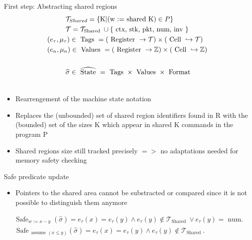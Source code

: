\documentclass[aspectratio=169]{beamer}
\begin{document}
\begin{frame}{First step: Abstracting shared regions}
  $$
    \begin{aligned}
       & \hspace{1cm} \mathcal{T}_{Shared} = \{\text{K} | \text{(w := shared  K)} \in P \}                                                                 \\
       & \hspace{1cm} \mathcal{T}=\mathcal{T}_{\text {Shared }} \cup\{\text { ctx, stk, pkt, num, inv }\}                                                  \\
       & \left(e_\tau, \mu_\tau\right) \in \text { Tags } =(\text { Register } \rightarrow \mathcal{T}) \times(\text { Cell } \hookrightarrow \mathcal{T}) \\
       & \left(e_n, \mu_n\right) \in \text { Values }=(\text { Register } \rightarrow \mathbb{Z}) \times(\text { Cell } \hookrightarrow \mathbb{Z})        \\
       &                                                                                                                                                   \\
       & \vspace{1cm} \hspace{1cm} \widehat{\sigma} \in \widehat{\text { State }}=\text { Tags } \times \text { Values } \times \text { Format }           \\
       &
    \end{aligned}
  $$

  \begin{itemize}
    \item Rearrengement of the machine state notation
    \item Replaces the (unbounded) set of shared region
          identifiers found in R with the (bounded) set of the sizes K
          which appear in shared K commands in the program P
    \item Shared regions size still tracked precisely $=>$ no adaptations needed for memory safety checking
  \end{itemize}
\end{frame}

\begin{frame}{Safe predicate update}
  \begin{itemize}
    \item Pointers to the shared area cannot be substracted or compared
          since it is not possible to distinguish them anymore
  \end{itemize}

  $$
    \begin{aligned}
       & \operatorname{Safe}_{w:=x-y}(\widehat{\sigma})=  e_\tau(x)=e_\tau(y) \wedge e_\tau(y) \notin \mathcal{T}_{\text {Shared }}  \vee e_\tau(y)=\text { num. } \\
       & \text { Safe }_{\text {assume }(x \leq y)}(\widehat{\sigma})=  e_\tau(x)=e_\tau(y) \wedge e_\tau(y) \notin \mathcal{T}_{\text {Shared }} .                \\
    \end{aligned}
  $$
\end{frame}
\end{document}
